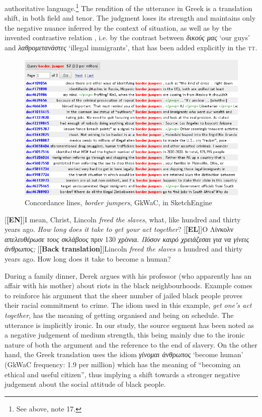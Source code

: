 \documentclass[output=paper]{LSP/langsci}
\begin{document}
authoritative language.\footnote{See above, note 17.} The rendition of the utterance in Greek is a translation shift, in both field and tenor. The judgment loses its strength and maintains only the negative nuance inferred by the context of situation, as well as by the invented contrastive relation \citep[87--89]{Fairclough2003}, i.e. by the contrast between \textit{δικούς μας} `our guys' and \textit{λαθρομετανάστες} `illegal immigrants', that has been added explicitly in the \textsc{tt}.

\begin{figure}
\includegraphics[width=.9\textwidth]{./figures/4-4.png}
\caption{Concordance lines, \textit{border jumpers}, GkWaC, in SketchEngine} \label{fig:2:5}
\end{figure}

\ea \label{ex:2:22}
\begin{xlist}
\exi{}[\textbf{[EN]}]{I mean, Christ, Lincoln \emph{freed the slaves}, what, like hundred and thirty years ago. \emph{How long does it take to get your act together}?}
\exi{}[\textbf{[EL]}]{Ο Λίνκολν \emph{απελευθέρωσε τους σκλάβους} πριν 130 χρόνια. \emph{Πόσον καιρό χρειάζεσαι για να γίνεις άνθρωπος;}}
\exi{}[\textbf{[Back translation]}]{Lincoln \emph{freed the slaves} a hundred and thirty years ago. How long does it take to become a human?}
\end{xlist}
\z

During a family dinner, Derek argues with his professor (who apparently has an affair with his mother) about riots in the black neighbourhoods. Example  comes to reinforce his argument that the sheer number of jailed black people proves their racial commitment to crime. The idiom used in this example, \textit{get one's act together}, has the meaning of getting organised and being on schedule. The utterance is implicitly ironic. In our study, the source segment has been noted as a negative judgement of medium strength, this being mainly due to the ironic nature of both the argument and the reference to the end of slavery. On the other hand, the Greek translation uses the idiom \textit{γίνομαι άνθρωπος} `become human' (GkWaC frequency: 1.9 per million) which has the meaning of “becoming an ethical and useful citizen”, thus implying a shift towards a stronger negative judgement about the social attitude of black people.\newline
\end{document}
